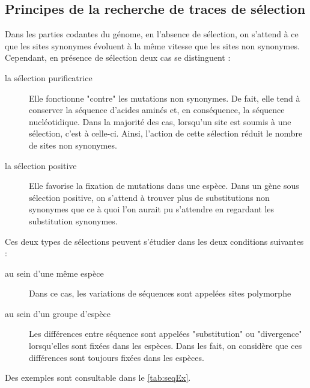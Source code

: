 \documentclass[../main]{subfiles} %
\begin{document}
\subsection{Principes de la recherche de traces de sélection}
\label{PrincipeTrace}

Dans les parties codantes du génome, en l'absence de sélection, on s'attend à ce que les sites \glspl{synonyme} évoluent à la même vitesse que les sites non \glspl{synonyme}. Cependant, en présence de sélection deux cas se distinguent :
\begin{description}

    \item [la sélection purificatrice] Elle fonctionne "contre" les mutations non \glspl{synonyme}. De fait, elle tend à conserver la séquence d'acides aminés et, en conséquence, la séquence nucléotidique. Dans la majorité des cas, lorsqu'un site est soumis à une sélection, c'est à celle-ci. Ainsi, l'action de cette sélection réduit le nombre de sites non \glspl{synonyme}.

    \item [la sélection positive] Elle favorise la fixation de mutations dans une espèce. Dans un gène sous sélection positive, on s'attend à trouver plus de substitutions non \glspl{synonyme} que ce à quoi l'on aurait pu s'attendre en regardant les substitution \glspl{synonyme}.
    
\end{description}

Ces deux types de sélections peuvent s'étudier dans les deux conditions suivantes :
\begin{description}
    \item [au sein d’une même espèce] Dans ce cas, les variations de séquences sont appelées sites polymorphe
    \item [au sein d'un groupe d'espèce] Les différences entre séquence sont appelées "\gls{substitution}" ou "divergence" lorsqu'elles sont fixées dans les espèces. Dans les fait, on  considère que ces différences sont toujours fixées dans les espèces.
\end{description}
Des exemples sont consultable dans le \cref{tab:seqEx}.
\end{document}
